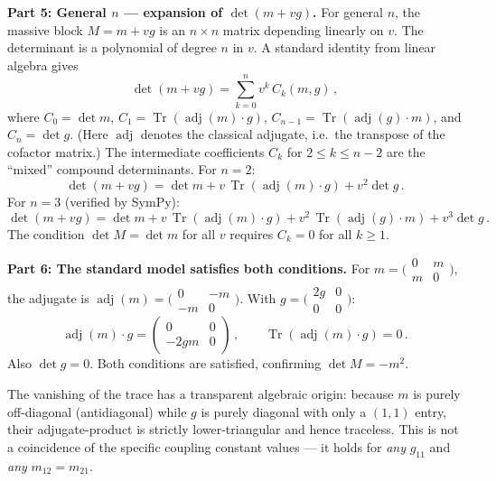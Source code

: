 \bigskip
\textbf{Part 5: General $n$ --- expansion of $\det(m + vg)$.}
For general $n$, the massive block $M = m + vg$ is an $n\times n$ matrix
depending linearly on $v$. The determinant is a polynomial of degree $n$ in $v$.
A standard identity from linear algebra gives
$$
\det(m + vg) = \sum_{k=0}^{n} v^k\, C_k(m, g)\,,
$$
where $C_0 = \det m$, $C_1 = \operatorname{Tr}(\operatorname{adj}(m)\cdot g)$,
$C_{n-1} = \operatorname{Tr}(\operatorname{adj}(g)\cdot m)$, and $C_n = \det g$.
(Here $\operatorname{adj}$ denotes the classical adjugate, i.e.\ the transpose of
the cofactor matrix.) The intermediate coefficients $C_k$ for $2 \leq k \leq n-2$
are the ``mixed'' compound determinants. For $n = 2$:
$$
\det(m + vg) = \det m + v\,\operatorname{Tr}(\operatorname{adj}(m)\cdot g) + v^2\det g\,.
$$
For $n = 3$ (verified by SymPy):
$$
\det(m + vg) = \det m + v\,\operatorname{Tr}(\operatorname{adj}(m)\cdot g)
+ v^2\,\operatorname{Tr}(\operatorname{adj}(g)\cdot m) + v^3\det g\,.
$$
The condition $\det M = \det m$ for all $v$ requires $C_k = 0$ for all $k \geq 1$.

\bigskip
\textbf{Part 6: The standard model satisfies both conditions.}
For $m = \bigl(\begin{smallmatrix} 0 & m \\ m & 0 \end{smallmatrix}\bigr)$,
the adjugate is $\operatorname{adj}(m) = \bigl(\begin{smallmatrix} 0 & -m \\ -m & 0 \end{smallmatrix}\bigr)$.
With $g = \bigl(\begin{smallmatrix} 2g & 0 \\ 0 & 0 \end{smallmatrix}\bigr)$:
$$
\operatorname{adj}(m) \cdot g = \begin{pmatrix} 0 & 0 \\ -2gm & 0 \end{pmatrix}\,,
\qquad \operatorname{Tr}(\operatorname{adj}(m)\cdot g) = 0\,.
$$
Also $\det g = 0$. Both conditions are satisfied, confirming $\det M = -m^2$.

The vanishing of the trace has a transparent algebraic origin: because $m$ is
purely off-diagonal (antidiagonal) while $g$ is purely diagonal with only a
$(1,1)$ entry, their adjugate-product is strictly lower-triangular and hence
traceless. This is not a coincidence of the specific coupling constant values
--- it holds for \emph{any} $g_{11}$ and \emph{any} $m_{12} = m_{21}$.

